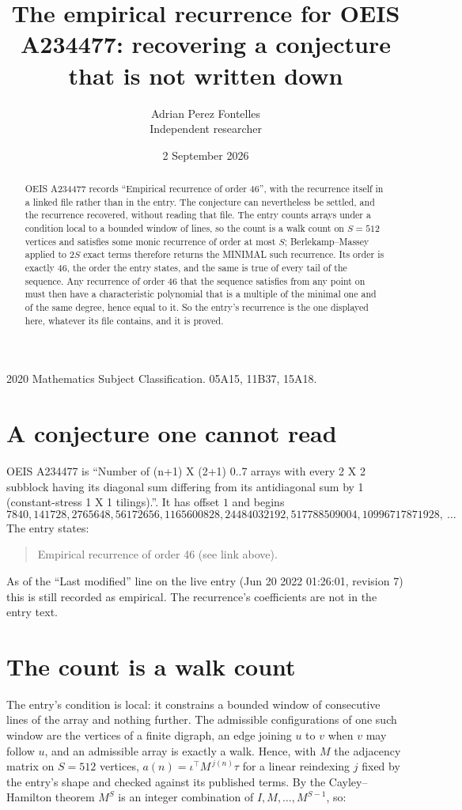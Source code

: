 \documentclass[11pt,a4paper]{article}
\title{The empirical recurrence for OEIS A234477: recovering a conjecture that is not written down}
\author{Adrian Perez Fontelles\\ \small Independent researcher}
\date{2 September 2026}
\theoremstyle{plain}
\theoremstyle{definition}
\begin{document}
\maketitle

\begin{abstract}
OEIS A234477 records ``Empirical recurrence of order $46$'', with the recurrence itself in a
linked file rather than in the entry. The conjecture can nevertheless be settled, and the
recurrence recovered, without reading that file. The entry counts arrays under a condition
local to a bounded window of lines, so the count is a walk count on $S=512$ vertices and
satisfies some monic recurrence of order at most $S$; Berlekamp--Massey applied to $2S$ exact
terms therefore returns the MINIMAL such recurrence. Its order is exactly $46$, the order
the entry states, and the same is true of every tail of the sequence. Any recurrence of order
$46$ that the sequence satisfies from any point on must then have a characteristic
polynomial that is a multiple of the minimal one and of the same degree, hence equal to it. So
the entry's recurrence is the one displayed here, whatever its file contains, and it is
proved.
\end{abstract}

\noindent\small 2020 Mathematics Subject Classification. 05A15, 11B37, 15A18.\normalsize

\section{A conjecture one cannot read}

OEIS A234477 is ``Number of (n+1) X (2+1) 0..7 arrays with every 2 X 2 subblock having its diagonal sum differing from its antidiagonal sum by 1 (constant-stress 1 X 1 tilings).''. It has offset $1$ and begins
\[
7840, 141728, 2765648, 56172656, 1165600828, 24484032192, 517788509004, 10996717871928,\ \dots
\]
The entry states:
\begin{quote}
Empirical recurrence of order 46 (see link above).
\end{quote}
As of the ``Last modified'' line on the live entry (Jun 20 2022 01:26:01, revision 7) this is still
recorded as empirical. The recurrence's coefficients are not in the entry text.

\section{The count is a walk count}

The entry's condition is local: it constrains a bounded window of consecutive lines of the
array and nothing further. The admissible configurations of one such window are the vertices
of a finite digraph, an edge joining $u$ to $v$ when $v$ may follow $u$, and an admissible
array is exactly a walk. Hence, with $M$ the adjacency matrix on $S=512$ vertices,
$a(n)=\iota^{\!\top}M^{\,j(n)}\tau$ for a linear reindexing $j$ fixed by the entry's shape
and checked against its published terms. By the Cayley--Hamilton theorem $M^{S}$ is an
integer combination of $I,M,\dots,M^{S-1}$, so:
\end{document}
